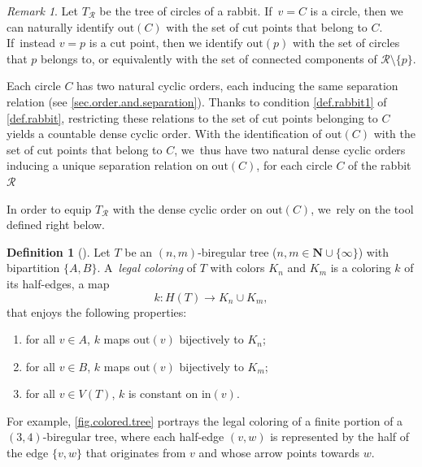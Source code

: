 \documentclass[JEP,XML,SOM,Unicode,NoFloatCountersInSection,published]{cedram}
\theoremstyle{plain}
\theoremstyle{definition}
\newtheorem{definition}[theorem]{Definition}
\theoremstyle{remark}
\newtheorem{remark}[theorem]{Remark}
\newcommand{\R}{\mathcal{R}}
\begin{document}
\begin{remark}
\label{rmk.rabbit.tree.separation.relation}
Let $T_\R$ be the tree of circles of a rabbit. If~$v = C$ is a circle, then we can naturally identify $\mathrm{out}(C)$ with the set of cut points that belong to $C$. If~instead $v = p$ is a cut point, then we identify $\mathrm{out}(p)$ with the set of circles that $p$ belongs to, or equivalently with the set of connected components of $\R \setminus \{p\}$.

Each circle $C$ has two natural cyclic orders, each inducing the same separation relation (see \cref{sec.order.and.separation}).
Thanks to condition \cref{def.rabbit1} of \cref{def.rabbit}, restricting these relations to the set of cut points belonging to $C$ yields a countable dense cyclic order.
With the identification of $\mathrm{out}(C)$ with the set of cut points that belong to $C$, we~thus have two natural dense cyclic orders inducing a unique separation relation on $\mathrm{out}(C)$, for each circle $C$ of the rabbit $\R$
\end{remark}

In order to equip $T_\R$ with the dense cyclic order on $\mathrm{out}(C)$, we~rely on the tool defined right below.

\begin{definition}[\cite{biregular}]
\label{def.legal.coloring}
Let $T$ be an $(n,m)$-biregular tree ($n, m \in \mathbf{N} \cup \{\infty\}$) with bipartition $\{A,B\}$. A~\emph{legal coloring} of $T$ with colors $K_n$ and $K_m$ is a coloring $k$ of its half-edges, \ie a map
\[
 k \colon H(T) \to K_n \cup K_m, 
\]
that enjoys the following properties:
\begin{enumerate}
\item for all $v \in A$, $k$ maps $\mathrm{out}(v)$ bijectively to $K_n$;
\item for all $v \in B$, $k$ maps $\mathrm{out}(v)$ bijectively to $K_m$;
\item for all $v \in V(T)$, $k$ is constant on $\mathrm{in}(v)$.
\end{enumerate}
\end{definition}

For example, \cref{fig.colored.tree} portrays the legal coloring of a finite portion of a $(3,4)$-biregular tree, where each half-edge $(v,w)$ is represented by the half of the edge $\{v,w\}$ that originates from $v$ and whose arrow points towards $w$.
\end{document}
